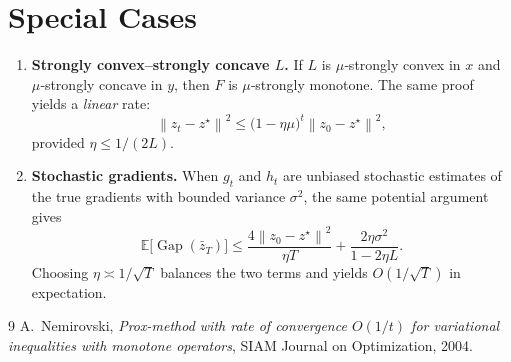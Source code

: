 \documentclass{article}
\newcommand{\norm}[1]{\left\lVert#1\right\rVert}
\begin{document}
\section*{Special Cases}
\begin{enumerate}[label=\alph*)]
\item \textbf{Strongly convex–strongly concave $L$.} If $L$ is $\mu$‑strongly convex in $x$ and $\mu$‑strongly concave in $y$, then $F$ is $\mu$‑strongly monotone. The same proof yields a \emph{linear} rate:
\[
\norm{z_{t}-z^{\star}}^{2}\le\bigl(1-\eta\mu\bigr)^{t}\norm{z_{0}-z^{\star}}^{2},
\]
provided $\eta\le 1/(2L)$.
\item \textbf{Stochastic gradients.} When $g_{t}$ and $h_{t}$ are unbiased stochastic estimates of the true gradients with bounded variance $\sigma^{2}$, the same potential argument gives
\[
\mathbb{E}\bigl[\operatorname{Gap}(\bar z_{T})\bigr]
\le
\frac{4\norm{z_{0}-z^{\star}}^{2}}{\eta T}
+ \frac{2\eta\sigma^{2}}{1-2\eta L}.
\]
Choosing $\eta\asymp 1/\sqrt{T}$ balances the two terms and yields $O(1/\sqrt{T})$ in expectation.
\end{enumerate}

\begin{thebibliography}{9}
A.~Nemirovski,
\newblock \emph{Prox-method with rate of convergence $O(1/t)$ for variational inequalities with monotone operators},
\newblock SIAM Journal on Optimization, 2004.
\end{thebibliography}
\end{document}
